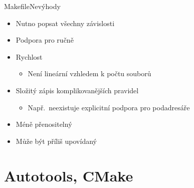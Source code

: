 \begin{frame}{Makefile}{Nevýhody}

  \begin{itemize}
    \item Nutno popsat všechny závislosti

    \pause

    \item Podpora pro  ručně

    \pause

    \item Rychlost
    \begin{itemize}
      \item Není lineární vzhledem k počtu souborů
    \end{itemize}

    \pause

    \item Složitý zápis komplikovanějších pravidel
    \begin{itemize}
      \item Např.\ neexistuje explicitní podpora pro podadresáře
    \end{itemize}

    \pause

    \item Méně přenositelný

    \pause

    \item Může být příliš upovídaný
  \end{itemize}

\end{frame}

\section{Autotools, CMake}
\frame{\sectionpage}


